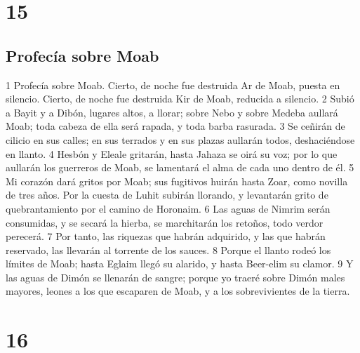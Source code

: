 \chapter{15}

\section*{Profecía sobre Moab}

1 Profecía sobre Moab. Cierto, de noche fue destruida Ar de Moab, puesta en silencio. Cierto, de noche fue destruida Kir de Moab, reducida a silencio.
2 Subió a Bayit y a Dibón, lugares altos, a llorar; sobre Nebo y sobre Medeba aullará Moab; toda cabeza de ella será rapada, y toda barba rasurada.
3 Se ceñirán de cilicio en sus calles; en sus terrados y en sus plazas aullarán todos, deshaciéndose en llanto.
4 Hesbón y Eleale gritarán, hasta Jahaza se oirá su voz; por lo que aullarán los guerreros de Moab, se lamentará el alma de cada uno dentro de él.
5 Mi corazón dará gritos por Moab; sus fugitivos huirán hasta Zoar, como novilla de tres años. Por la cuesta de Luhit subirán llorando, y levantarán grito de quebrantamiento por el camino de Horonaim.
6 Las aguas de Nimrim serán consumidas, y se secará la hierba, se marchitarán los retoños, todo verdor perecerá.
7 Por tanto, las riquezas que habrán adquirido, y las que habrán reservado, las llevarán al torrente de los sauces.
8 Porque el llanto rodeó los límites de Moab; hasta Eglaim llegó su alarido, y hasta Beer-elim su clamor.
9 Y las aguas de Dimón se llenarán de sangre; porque yo traeré sobre Dimón males mayores, leones a los que escaparen de Moab, y a los sobrevivientes de la tierra.

\chapter{16}

